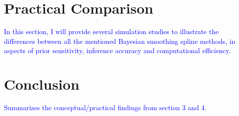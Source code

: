 \documentclass{article}
\newcommand{\ziang}{\textcolor{blue}}
\begin{document}
\section{Practical Comparison}
\ziang{In this section, I will provide several simulation studies to illustrate the differences between all the mentioned Bayesian smoothing spline methods, in aspects of prior sensitivity, inference accuracy and computational efficiency.}
\section{Conclusion}
\ziang{Summarizes the conceptual/practical findings from section 3 and 4.}

\newpage


\end{document}
